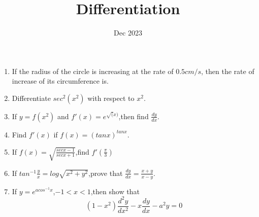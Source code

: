 \documentclass[12pt,-letter paper]{article}
\title{Differentiation}
\date{Dec 2023}
\begin{document}
\maketitle
\begin{enumerate}
\item If the radius of the circle is increasing at the rate of $0.5cm/s$, then the rate of increase of its circumference is.

\item Differentiate $sec^2(x^2)$ with respect to $x^2$.

\item If $y=f(x^2)$ and $f'(x)=e^{\sqrt(x)}$,then find $\frac{dy}{dx}$.

\item Find $f'(x)$ if $f(x)=(tan x)^{tan x}$.

\item If $f(x)=\sqrt{\frac{sec x -1}{sec x + 1}}$,find $f'(\frac{\pi}{3})$

\item If $tan^{-1}\frac{y}{x}= log\sqrt{x^2 + y^2}$,prove that $\frac{dy}{dx}=\frac{x+y}{x-y}$.

\item If $y=e^{a cos^{-1}x}$,$-1<x<1$,then show that
	$$(1-x^2)\frac{d^2y}{dx^2}-x\frac{dy}{dx}-a^2y=0$$
\end{enumerate}
\end{document}
